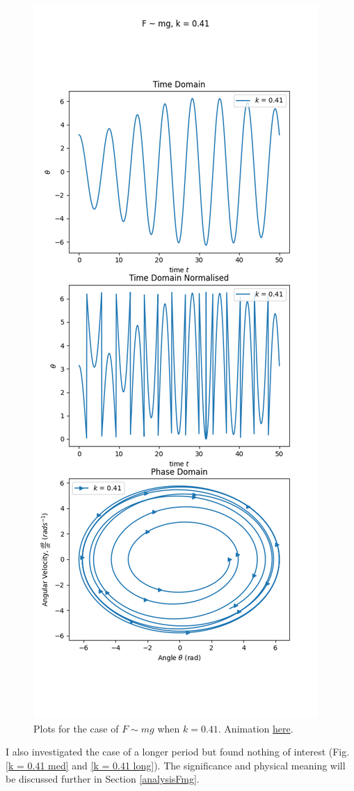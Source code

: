 \documentclass[10pt, twocolumn]{article}
\begin{document}
\begin{figure}[H]
    \centering
    \includegraphics[width = 0.9\columnwidth]{Projects/ForcedSimplePendulum/Plots/Plot of F~mg, k is 0.41.png}
    \caption{Plots for the case of $F\sim{mg}$ when $k = 0.41$. Animation \href{https://github.com/linsuong/PHYS-6017-Labs/blob/main/Projects/ForcedSimplePendulum/Plots/F~mg\%2C\%20k\%20is\%200.41.gif}{here}.}
    \label{k = 0.41}
\end{figure}
I also investigated the case of a longer period but found nothing of interest (Fig. \ref{k = 0.41 med} and \ref{k = 0.41 long}). The significance and physical meaning will be discussed further in Section \ref{analysisFmg}.
\end{document}
